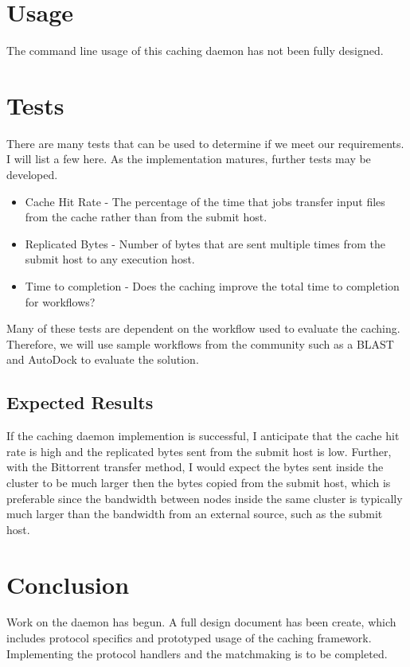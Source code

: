 \section{Usage}
The command line usage of this caching daemon has not been fully designed.

\section{Tests}

There are many tests that can be used to determine if we meet our requirements.  I will list a few here.  As the implementation matures, further tests may be developed.

\begin{itemize}
\item Cache Hit Rate - The percentage of the time that jobs transfer input files from the cache rather than from the submit host.
\item Replicated Bytes - Number of bytes that are sent multiple times from the submit host to any execution host.
\item Time to completion - Does the caching improve the total time to completion for workflows?

\end{itemize}

Many of these tests are dependent on the workflow used to evaluate the caching.  Therefore, we will use sample workflows from the community such as a BLAST and AutoDock to evaluate the solution.

\subsection{Expected Results}

If the caching daemon implemention is successful, I anticipate that the cache hit rate is high and the replicated bytes sent from the submit host is low.  Further, with the Bittorrent transfer method, I would expect the bytes sent inside the cluster to be much larger then the bytes copied from the submit host, which is preferable since the bandwidth between nodes inside the same cluster is typically much larger than the bandwidth from an external source, such as the submit host.

\section{Conclusion}

Work on the daemon has begun.  A full design document has been create, which includes protocol specifics and prototyped usage of the caching framework.  Implementing the protocol handlers and the matchmaking is to be completed.



